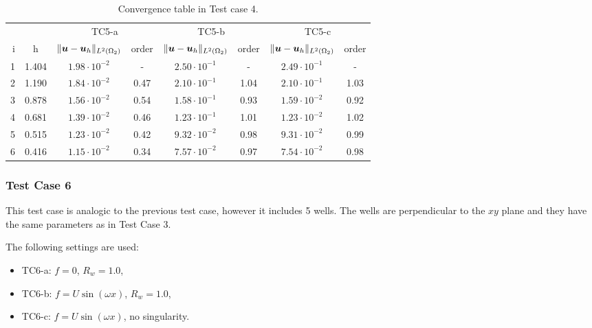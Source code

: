 \begin{table}[!htb]
\begin{center}
\bgroup
\def\arraystretch{1.2}
\setlength\tabcolsep{5pt}
\begin{tabular}{rc|cc|cc|cc}
\toprule
\multicolumn{2}{c|}{} & \multicolumn{2}{c|}{ TC5-a } & \multicolumn{2}{c|}{ TC5-b } & \multicolumn{2}{c}{TC5-c}\\ [3pt] %
i & h & $\|\mathbf{\boldsymbol{u}}-\mathbf{\boldsymbol{u}}_h\|_{L^2(\Omega_2)}$ & order & $\|\mathbf{\boldsymbol{u}}-\mathbf{\boldsymbol{u}}_h\|_{L^2(\Omega_2)}$
    & order & $\|\mathbf{\boldsymbol{u}}-\mathbf{\boldsymbol{u}}_h\|_{L^2(\Omega_2)}$ & order \\ [3pt] \midrule
1 & 1.404 &  $1.98\cdot10^{-2}$  &  -   &  $2.50\cdot10^{-1}$  &  -   &  $2.49\cdot10^{-1}$ &   -   \\
2 & 1.190 &  $1.84\cdot10^{-2}$  & 0.47 &  $2.10\cdot10^{-1}$  & 1.04 &  $2.10\cdot10^{-1}$ &  1.03 \\
3 & 0.878 &  $1.56\cdot10^{-2}$  & 0.54 &  $1.58\cdot10^{-1}$  & 0.93 &  $1.59\cdot10^{-2}$ &  0.92 \\
4 & 0.681 &  $1.39\cdot10^{-2}$  & 0.46 &  $1.23\cdot10^{-1}$  & 1.01 &  $1.23\cdot10^{-2}$ &  1.02 \\
5 & 0.515 &  $1.23\cdot10^{-2}$  & 0.42 &  $9.32\cdot10^{-2}$  & 0.98 &  $9.31\cdot10^{-2}$ &  0.99 \\
6 & 0.416 &  $1.15\cdot10^{-2}$  & 0.34 &  $7.57\cdot10^{-2}$  & 0.97 &  $7.54\cdot10^{-2}$ &  0.98 \\
\bottomrule
\end{tabular}
\caption{Convergence table in Test case 4.}
\label{tab:mh_tc5_convergence}
\egroup
\end{center}
\end{table}


\subsubsection{Test Case 6}
This test case is analogic to the previous test case, however it includes 5 wells.
The wells are perpendicular to the $xy$ plane and they have the same parameters as in Test Case 3.

The following settings are used:
\begin{itemize}
    \item TC6-a: $f=0$, $R_w=1.0$,
    \item TC6-b: $f=U\sin(\omega x)$, $R_w=1.0$,
    \item TC6-c: $f=U\sin(\omega x)$, no singularity.
\end{itemize}

